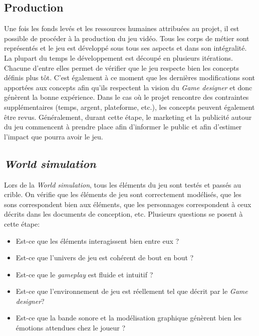 \subsection{Production}
Une fois les fonds levés et les ressources humaines attribuées au projet, il est possible de procéder à la production du jeu vidéo.
Tous les corps de métier sont représentés et le jeu est développé sous tous ses aspects et dans son intégralité.
La plupart du temps le développement est découpé en plusieurs itérations.
Chacune d'entre elles permet de vérifier que le jeu respecte bien les concepts définis plus tôt.
C'est également à ce moment que les dernières modifications sont apportées aux concepts afin qu'ils respectent la vision du \emph{Game designer} et donc génèrent la bonne expérience.
Dans le cas o\`u le projet rencontre des contraintes supplémentaires (temps, argent, plateforme, etc.), les concepts peuvent également être revus.
Généralement, durant cette étape, le marketing et la publicité autour du jeu commencent à prendre place afin d'informer le public et afin d'estimer l'impact que pourra avoir le jeu.

              
\subsection{\emph{World simulation}}
Lors de la \emph{World simulation}, tous les éléments du jeu sont testés et passés au crible.
On vérifie que les éléments de jeu sont correctement modélisés, que les sons correspondent bien aux éléments, que les personnages correspondent à ceux décrits dans les documents de conception, etc.
Plusieurs questions se posent à cette \'etape:
\begin{itemize}
    \item Est-ce que les éléments interagissent bien entre eux ?
    \item Est-ce que l'univers de jeu est cohérent de bout en bout ?
    \item Est-ce que le \emph{gameplay} est fluide et intuitif ?
    \item Est-ce que l'environnement de jeu est réellement tel que décrit par le \emph{Game designer}?
    \item Est-ce que la bande sonore et la modélisation graphique génèrent bien les émotions attendues chez le joueur ?
\end{itemize}


